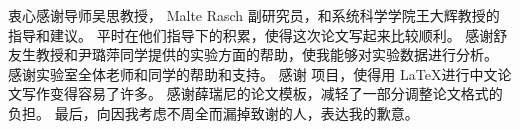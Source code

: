
\begin{ack}
衷心感谢导师吴思教授， Malte Rasch 副研究员，和系统科学学院王大辉教授的指导和建议。
平时在他们指导下的积累，使得这次论文写起来比较顺利。
感谢舒友生教授和尹璐萍同学提供的实验方面的帮助，使我能够对实验数据进行分析。
感谢实验室全体老师和同学的帮助和支持。
感谢 \XeLaTeX 项目，使得用 \LaTeX 进行中文论文写作变得容易了许多。
感谢薛瑞尼的论文模板，减轻了一部分调整论文格式的负担。
最后，向因我考虑不周全而漏掉致谢的人，表达我的歉意。
\end{ack}
